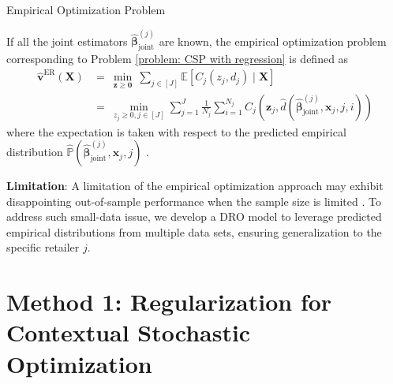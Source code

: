 \documentclass{beamer}
\newcommand{\mb}[1]{{\mathbf{#1}}}
\newcommand{\txrd}[1]{{\textcolor{sintefred}{\textbf{#1}}}}
\newcommand{\bbp}{\mathbb{P}}
\begin{document}

\begin{frame}{Empirical Optimization Problem}

If all the joint estimators $\hat{\bm \beta}_{\text{joint}}^{(j)}$ are known, the empirical optimization problem corresponding to Problem \eqref{problem: CSP with regression} is defined as
{
\large
\begin{equation}
\begin{aligned}
\hat{\bm v}^{\text{ER}}({\mb X}) & = \ 
\min_{\bm z \geq \bm 0} \ \sum_{j \in [J]} \mathbb{E} \left[  C_j (z_j,  d_j)  \mid \mb X \right]
 \\
& = \ 
\min_{ z_j \geq 0, j\in[J]}
 \sum_{j=1}^J 
 \frac{1}{N_j} \sum_{i = 1}^{N_j} 
C_j \left( \bm z_j, \hat{d}(\hat{\bm \beta}_{\text{joint}}^{(j)}, \bm x_j, j, i)  \right) 
\label{problem: Empirical Optimization Problem}
\end{aligned}
\end{equation}
}
where the expectation is taken with respect to the predicted empirical distribution $\hat{\bbp}(\hat{\bm \beta}_{\text{joint}}^{(j)},\bm x_j, j)$ \citep{kannan2025data}. \\

\vspace{0.3cm}

\txrd{Limitation}: A limitation of the empirical optimization approach may exhibit disappointing out-of-sample performance when the sample size is limited \citep{kannan2024residuals}. To address such \alert{small-data issue}, we develop a DRO model to leverage predicted empirical distributions from multiple data sets, ensuring generalization to the specific retailer $j$.

\end{frame}


\section{Method 1: Regularization for Contextual Stochastic Optimization}
\end{document}
